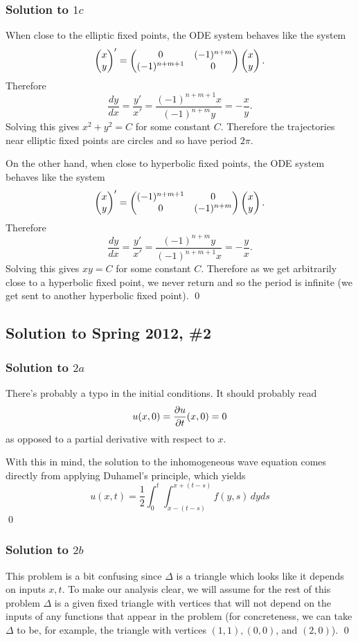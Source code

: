 \subsubsection*{Solution to $1c$}
When close to the elliptic fixed points, the ODE system behaves like the system
$$\begin{pmatrix} x \\ y\end{pmatrix}' = \begin{pmatrix} 0 & (-1)^{n + m} \\ (-1)^{n + m  + 1} & 0\end{pmatrix}\begin{pmatrix} x \\ y\end{pmatrix}.$$
Therefore
$$\frac{dy}{dx} = \frac{y'}{x'} = \frac{(-1)^{n + m + 1}x}{(-1)^{n + m}y} = -\frac{x}{y}.$$
Solving this gives $x^{2} + y^{2} = C$ for some constant $C$. Therefore the trajectories
near elliptic fixed points are circles and so have period $2\pi$.

On the other hand, when close to hyperbolic fixed points, the ODE system behaves like the system
$$\begin{pmatrix} x \\ y\end{pmatrix}' = \begin{pmatrix} (-1)^{n + m + 1} & 0 \\ 0 & (-1)^{n + m}\end{pmatrix}\begin{pmatrix} x \\ y\end{pmatrix}.$$
Therefore
$$\frac{dy}{dx} = \frac{y'}{x'} = \frac{(-1)^{n + m}y}{(-1)^{n + m + 1}x} = -\frac{y}{x}.$$
Solving this gives $xy = C$ for some constant $C$. Therefore as we get arbitrarily close to
a hyperbolic fixed point, we never return and so the period is infinite (we get sent
to another hyperbolic fixed point).
\hfill\qed

\subsection*{Solution to Spring 2012, \#2}\label{s122}

\subsubsection*{Solution to $2a$}
There's probably a typo in the initial conditions. It should probably read
$$ u(x,0) = \frac{\partial u}{\partial t} (x,0) = 0 $$
as opposed to a partial derivative with respect to $x$.

With this in mind, the solution to the inhomogeneous wave equation comes directly from applying Duhamel's principle, which yields
$$ u(x,t) = \frac{1}{2} \int_0^t \int_{x-(t-s)}^{x+(t-s)} f(y,s) \, dy ds $$ \hfill\qed

\subsubsection*{Solution to $2b$}
\begin{rem}
This problem is a bit confusing since $\Delta$ is a triangle which looks like it depends on inputs $x, t$.
To make our analysis clear, we will assume for the rest of this problem $\Delta$ is a given fixed triangle with vertices that
will not depend on the inputs of any functions that appear in the problem
(for concreteness, we can take $\Delta$ to be, for example, the triangle with vertices $(1, 1), (0, 0)$, and $(2, 0)$). \hfill\qed
\end{rem}

